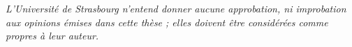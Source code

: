 \chapter*{}
\thispagestyle{empty}
\vspace*{\fill}
\textit{L’Université de Strasbourg n’entend donner aucune approbation, ni improbation
aux opinions émises dans cette thèse ; elles doivent être considérées comme propres
à leur auteur.}
